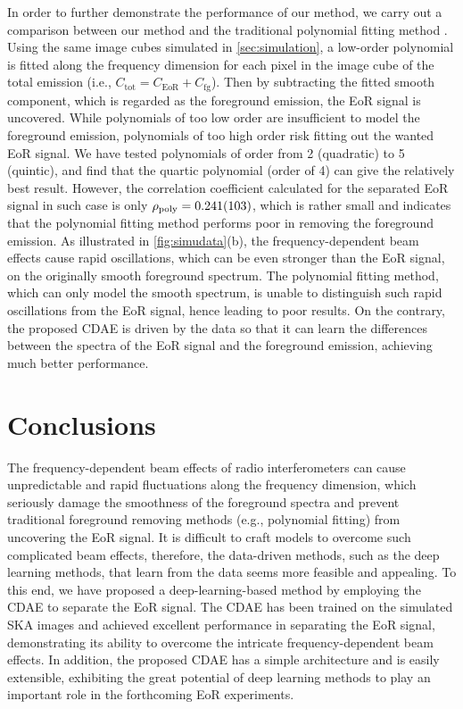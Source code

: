 \documentclass[letters,a4paper,fleqn,usenatbib]{mnras}
\newcommand{\R}[1]{\mathrm{#1}}
\begin{document}
In order to further demonstrate the performance of our method, we carry
out a comparison between our method and the traditional polynomial
fitting method \citep[e.g.,][]{wang2006,liu2009ps}.
Using the same image cubes simulated in \autoref{sec:simulation},
a low-order polynomial is fitted along the frequency dimension for each
pixel in the image cube of the total emission (i.e.,
$C_{\R{tot}} = C_{\R{EoR}} + C_{\R{fg}}$).
Then by subtracting the fitted smooth component, which is regarded as
the foreground emission, the EoR signal is uncovered.
While polynomials of too low order are insufficient to model the
foreground emission, polynomials of too high order risk fitting out
the wanted EoR signal.
We have tested polynomials of order from 2 (quadratic) to 5 (quintic),
and find that the quartic polynomial (order of 4) can give the
relatively best result.
However, the correlation coefficient calculated for the separated EoR
signal in such case is only $\rho_{\R{poly}} = \num{0.241 +- 0.103}$,
which is rather small and indicates that the polynomial fitting method
performs poor in removing the foreground emission.
As illustrated in \autoref{fig:simudata}(b), the frequency-dependent
beam effects cause rapid oscillations, which can be even stronger than
the EoR signal, on the originally smooth foreground spectrum.
The polynomial fitting method, which can only model the smooth
spectrum, is unable to distinguish such rapid oscillations from the
EoR signal, hence leading to poor results.
On the contrary, the proposed CDAE is driven by the data so that it can
learn the differences between the spectra of the EoR signal and the
foreground emission, achieving much better performance.


\section{Conclusions}
\label{sec:conclusions}

The frequency-dependent beam effects of radio interferometers can cause
unpredictable and rapid fluctuations along the frequency dimension,
which seriously damage the smoothness of the foreground spectra and
prevent traditional foreground removing methods (e.g., polynomial
fitting) from uncovering the EoR signal.
It is difficult to craft models to overcome such complicated beam
effects, therefore, the data-driven methods, such as the deep learning
methods, that learn from the data seems more feasible and appealing.
To this end, we have proposed a deep-learning-based method by employing
the CDAE to separate the EoR signal.
The CDAE has been trained on the simulated SKA images and achieved
excellent performance in separating the EoR signal, demonstrating its
ability to overcome the intricate frequency-dependent beam effects.
In addition, the proposed CDAE has a simple architecture and is easily
extensible, exhibiting the great potential of deep learning methods
to play an important role in the forthcoming EoR experiments.
\end{document}
